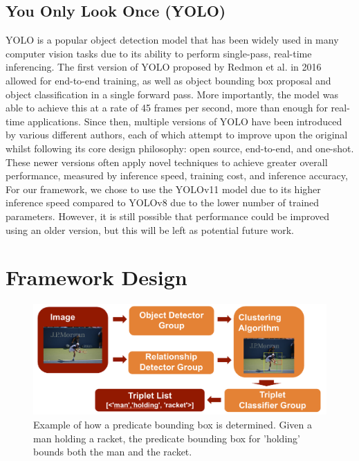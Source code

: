 \documentclass{article}
\begin{document}
\subsection*{You Only Look Once (YOLO)}
YOLO is a popular object detection model that has been widely used in many computer vision tasks due to its ability to perform single-pass, real-time inferencing. The first version of YOLO proposed by Redmon et al. in 2016 allowed for end-to-end training, as well as object bounding box proposal and object classification in a single forward pass\cite{redmon2016you}.
More importantly, the model was able to achieve this at a rate of 45 frames per second, more than enough for real-time applications. Since then, multiple versions of YOLO have been introduced by various different authors, each of which attempt to improve upon the original whilst following its core design philosophy: open source, end-to-end, and one-shot\cite{terven2023comprehensive}. These newer versions often apply novel techniques to achieve greater overall performance, measured by inference speed, training cost, and inference accuracy\cite{terven2023comprehensive,redmon2017yolo9000,sohan2024review}, 
For our framework, we chose to use the YOLOv11 model due to its higher inference speed compared to YOLOv8 due to the lower number of trained parameters\cite{ultralytics11}. However, it is still possible that performance could be improved using an older version, but this will be left as potential future work.

\section{Framework Design}

\begin{figure}
    \includegraphics[width=\textwidth]{figures/figure4.png}
  \centering
  \caption{Example of how a predicate bounding box is determined. Given a man holding a racket, the predicate bounding box for 'holding' bounds both the man and the racket.}
\end{figure}
\end{document}
